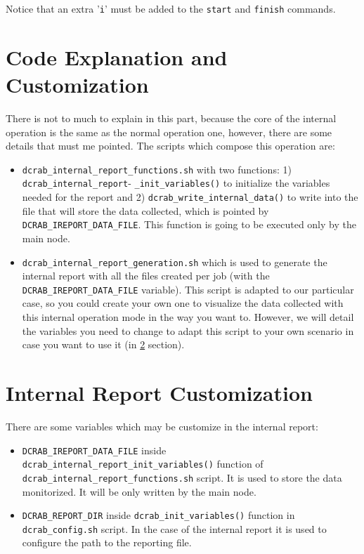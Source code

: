 \documentclass[10pt,a4paper]{report}
\begin{document}
Notice that an extra '\verb+i+' must be added to the \verb+start+ and \verb+finish+ commands.

\section{Code Explanation and Customization}

There is not to much to explain in this part, because the core of the internal operation is the same as the normal operation one, however, there are some details that must me pointed. The scripts which compose this operation are:

\begin{itemize}
  \item \texttt{dcrab\_internal\_report\_functions.sh} with two functions: 1) \texttt{dcrab\_internal\_report}- \texttt{\_init\_variables()} to initialize the variables needed for the report and 2) \texttt{dcrab\_write\_internal\_data()} to write into the file that will store the data collected, which is pointed by \verb+DCRAB_IREPORT_DATA_FILE+. This function is going to be executed only by the main node.
  \item \texttt{dcrab\_internal\_report\_generation.sh} which is used to generate the internal report with all the files created per job (with the \verb+DCRAB_IREPORT_DATA_FILE+ variable). This script is adapted to our particular case, so you could create your own one to visualize the data collected with this internal operation mode in the way you want to. However, we will detail the variables you need to change to adapt this script to your own scenario in case you want to use it (in \ref{internalReportCustomization} section).
\end{itemize}

\section{Internal Report Customization}
\label{internalReportCustomization}

There are some variables which may be customize in the internal report:

\begin{itemize}
  \item \texttt{DCRAB\_IREPORT\_DATA\_FILE} inside \texttt{dcrab\_internal\_report\_init\_variables()} function of \verb+dcrab_internal_report_functions.sh+ script. It is used to store the data monitorized. It will be only written by the main node.
  \item \texttt{DCRAB\_REPORT\_DIR} inside \texttt{dcrab\_init\_variables()} function in \verb+dcrab_config.sh+ script. In the case of the internal report it is used to configure the path to the reporting file.
\end{itemize}
\end{document}
